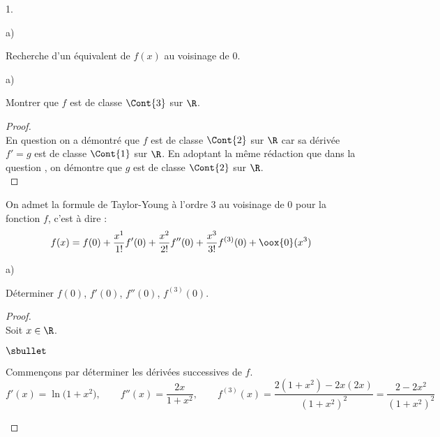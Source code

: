 \documentclass[11pt]{article}%
\begin{document}
\begin{noliste}{1.}
\begin{noliste}{a)}
  \end{noliste}

\item Recherche d'un équivalent de $f(x)$ au voisinage de $0$.
  \begin{noliste}{a)}
    \setlength{\itemsep}{2mm}
  \item Montrer que $f$ est de classe $\Cont{3}$ sur $\R$.

    \begin{proof}~\\%
      En question  on a démontré que $f$ est de classe
      $\Cont{2}$ sur $\R$ car sa dérivée $f' = g$ est de classe
      $\Cont{1}$ sur $\R$. En adoptant la même rédaction que dans la
      question , on démontre que $g$ est de classe
      $\Cont{2}$ sur $\R$.%
      ~\\[-1.2cm] 
    \end{proof}
  \end{noliste}
  On admet la formule de Taylor-Young à l'ordre $3$ au voisinage de
  $0$ pour la fonction $f$, c'est à dire :
  \[
  f(x) = f(0) + \dfrac{x^1}{1!} f'(0) + \dfrac{x^2}{2!} f''(0) +
  \dfrac{x^3}{3!} f^{(3)}(0) + \oox{0} (x^3)
  \]
  \begin{noliste}{a)}
    \setcounter{enumii}{1} %
    \setlength{\itemsep}{2mm}
  \item Déterminer $f(0)$, $f'(0)$, $f''(0)$, $f^{(3)}(0)$.

    \begin{proof}~\\%
      Soit $x \in \R$.
      \begin{noliste}{$\sbullet$}
      \item Commençons par déterminer les dérivées successives de $f$.
        \[
        f'(x) = \ln\big( 1+x^2 \big), \qquad f''(x) =
        \dfrac{2x}{1+x^2}, \qquad f^{(3)}(x) = \dfrac{2(1+x^2) -
          2x(2x)}{(1+x^2)^2} = \dfrac{2 - 2x^2}{(1+x^2)^2}
        \]


\end{noliste}
\end{proof}
\end{noliste}
\end{noliste}
\end{document}
